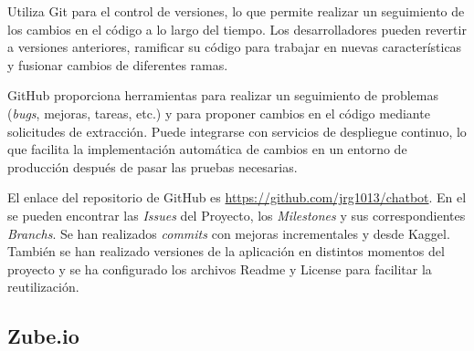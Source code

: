 Utiliza Git para el control de versiones, lo que permite realizar un seguimiento de los cambios en el código a lo largo del tiempo. Los desarrolladores pueden revertir a versiones anteriores, ramificar su código para trabajar en nuevas características y fusionar cambios de diferentes ramas.

GitHub proporciona herramientas para realizar un seguimiento de problemas (\textit{bugs}, mejoras, tareas, etc.) y para proponer cambios en el código mediante solicitudes de extracción. Puede integrarse con servicios de despliegue continuo, lo que facilita la implementación automática de cambios en un entorno de producción después de pasar las pruebas necesarias.

El enlace del repositorio de GitHub es \url{https://github.com/jrg1013/chatbot}. En el se pueden encontrar las \textit{Issues} del Proyecto, los \textit{Milestones} y sus correspondientes \textit{Branchs}. Se han realizados \textit{commits} con mejoras incrementales y desde Kaggel. También se han realizado versiones de la aplicación en distintos momentos del proyecto y se ha configurado los archivos Readme y License para facilitar la reutilización.

\subsection{Zube.io}

